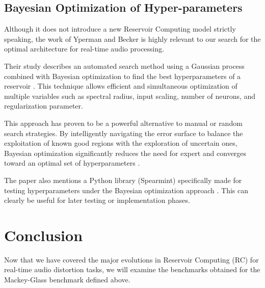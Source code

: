 \subsection{Bayesian Optimization of Hyper-parameters}

Although it does not introduce a new Reservoir Computing model strictly speaking, the work of Yperman and Becker \cite{yperman2016bayesian} is highly relevant to our search for the optimal architecture for real-time audio processing.

\vspace{0.5cm}

Their study describes an automated search method using a Gaussian process combined with Bayesian optimization to find the best hyperparameters of a reservoir \cite{yperman2016bayesian}. This technique allows efficient and simultaneous optimization of multiple variables such as spectral radius, input scaling, number of neurons, and regularization parameter.

\vspace{0.5cm}

This approach has proven to be a powerful alternative to manual or random search strategies. By intelligently navigating the error surface to balance the exploitation of known good regions with the exploration of uncertain ones, Bayesian optimization significantly reduces the need for expert and converges toward an optimal set of hyperparameters \cite{yperman2016bayesian}.

\vspace{0.5cm}

The paper also mentions a Python library (Spearmint) specifically made for testing hyperparameters under the Bayesian optimization approach \cite{yperman2016bayesian}. This can clearly be useful for later testing or implementation phases.

\section{Conclusion}

Now that we have covered the major evolutions in Reservoir Computing (RC) for real-time audio distortion tasks, we will examine the benchmarks obtained for the Mackey-Glass benchmark defined above.

